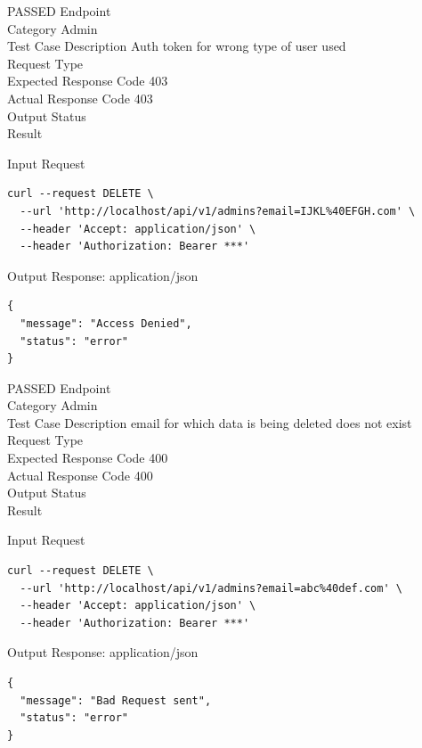 \begin{testcase}{42}{PASSED}
Endpoint \hfill {}\\
Category \hfill Admin\\
Test Case Description \hfill Auth token for wrong type of user used\\

Request Type    \hfill {}\\
Expected Response Code    \hfill 403\\
Actual Response Code    \hfill 403\\

Output Status \hfill {}\\
Result \hfill {}

\begin{ipblock}{Input Request}
\begin{verbatim}
curl --request DELETE \
  --url 'http://localhost/api/v1/admins?email=IJKL%40EFGH.com' \
  --header 'Accept: application/json' \
  --header 'Authorization: Bearer ***'
\end{verbatim}
\end{ipblock}

\begin{opblock}{Output Response: application/json}
\begin{verbatim}
{
  "message": "Access Denied",
  "status": "error"
}
\end{verbatim}
\end{opblock}
\end{testcase}

\begin{testcase}{43}{PASSED}
Endpoint \hfill {}\\
Category \hfill Admin\\
Test Case Description \hfill email for which data is being deleted does not exist\\

Request Type    \hfill \eptype{DELETE}\\
Expected Response Code    \hfill 400\\
Actual Response Code    \hfill 400\\

Output Status \hfill {}\\
Result \hfill {}

\begin{ipblock}{Input Request}
\begin{verbatim}
curl --request DELETE \
  --url 'http://localhost/api/v1/admins?email=abc%40def.com' \
  --header 'Accept: application/json' \
  --header 'Authorization: Bearer ***'
\end{verbatim}
\end{ipblock}

\begin{opblock}{Output Response: application/json}
\begin{verbatim}
{
  "message": "Bad Request sent",
  "status": "error"
}
\end{verbatim}
\end{opblock}
\end{testcase}


